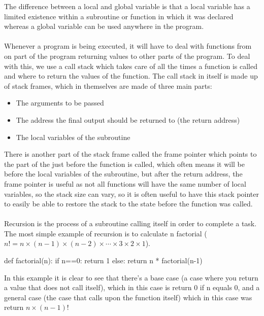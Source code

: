   The difference between a local and global variable is that a local variable has a limited existence within a subroutine or function in which it was declared whereas a global variable can be used anywhere in the program.\\ \\
  \noindent
  Whenever a program is being executed, it will have to deal with functions from on part of the program returning values to other parts of the program. To deal with this, we use a call stack which takes care of all the times a function is called and where to return the values of the function. The call stack in itself is made up of stack frames, which in themselves are made of three main parts:
  \begin{itemize}
  	\item The arguments to be passed
  	\item The address the final output should be returned to (the return address)
  	\item The local variables of the subroutine
  \end{itemize}
  There is another part of the stack frame called the frame pointer which points to the part of the just before the function is called, which often means it will be before the local variables of the subroutine, but after the return address, the frame pointer is useful as not all functions will have the same number of local variables, so the stack size can vary, so it is often useful to have this stack pointer to easily be able to restore the stack to the state before the function was called.\\ \\
  \noindent
  Recursion is the process of a subroutine calling itself in order to complete a task. The most simple example of recursion is to calculate n factorial ($n! = n\times(n-1)\times(n-2)\times\cdots\times3\times2\times1$).

  \begin{python}
def factorial(n):
	if n==0:
		return 1
	else:
		return n * factorial(n-1)\end{python}

  In this example it is clear to see that there's a base case (a case where you return a value that does not call itself), which in this case is return 0 if n equals 0, and a general case (the case that calls upon the function itself) which in this case was return $n \times (n-1)!$
